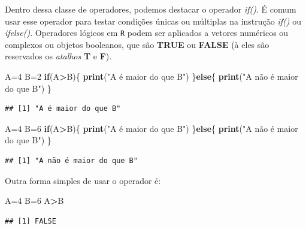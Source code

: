 \documentclass[
]{book}
\newenvironment{Shaded}{\begin{snugshade}}{\end{snugshade}}
\newcommand{\ControlFlowTok}[1]{\textcolor[rgb]{0.13,0.29,0.53}{\textbf{#1}}}
\newcommand{\DecValTok}[1]{\textcolor[rgb]{0.00,0.00,0.81}{#1}}
\newcommand{\KeywordTok}[1]{\textcolor[rgb]{0.13,0.29,0.53}{\textbf{#1}}}
\newcommand{\NormalTok}[1]{#1}
\newcommand{\OperatorTok}[1]{\textcolor[rgb]{0.81,0.36,0.00}{\textbf{#1}}}
\newcommand{\StringTok}[1]{\textcolor[rgb]{0.31,0.60,0.02}{#1}}
\theoremstyle{definition}
\theoremstyle{definition}
\theoremstyle{definition}
\theoremstyle{remark}
\begin{document}
Dentro dessa classe de operadores, podemos destacar o operador \emph{if()}. É comum usar esse operador para testar condições únicas ou múltiplas na instrução \emph{if()} ou \emph{ifelse()}. Operadores lógicos em \texttt{R} podem ser aplicados a vetores numéricos ou complexos ou objetos booleanos, que são \textbf{TRUE} ou \textbf{FALSE} (à eles são reservados os \emph{atalhos} \textbf{T} e \textbf{F}).

\begin{Shaded}
\begin{Highlighting}[]
\NormalTok{A=}\DecValTok{4}
\NormalTok{B=}\DecValTok{2}
\ControlFlowTok{if}\NormalTok{(A}\OperatorTok{>}\NormalTok{B)\{}
  \KeywordTok{print}\NormalTok{(}\StringTok{"A é maior do que B"}\NormalTok{)}
\NormalTok{  \}}\ControlFlowTok{else}\NormalTok{\{}
    \KeywordTok{print}\NormalTok{(}\StringTok{"A não é maior do que B"}\NormalTok{)}
\NormalTok{  \}}
\end{Highlighting}
\end{Shaded}

\begin{verbatim}
## [1] "A é maior do que B"
\end{verbatim}

\begin{Shaded}
\begin{Highlighting}[]
\NormalTok{A=}\DecValTok{4}
\NormalTok{B=}\DecValTok{6}
\ControlFlowTok{if}\NormalTok{(A}\OperatorTok{>}\NormalTok{B)\{}
  \KeywordTok{print}\NormalTok{(}\StringTok{"A é maior do que B"}\NormalTok{)}
\NormalTok{  \}}\ControlFlowTok{else}\NormalTok{\{}
    \KeywordTok{print}\NormalTok{(}\StringTok{"A não é maior do que B"}\NormalTok{)}
\NormalTok{  \}}
\end{Highlighting}
\end{Shaded}

\begin{verbatim}
## [1] "A não é maior do que B"
\end{verbatim}

Outra forma simples de usar o operador é:

\begin{Shaded}
\begin{Highlighting}[]
\NormalTok{A=}\DecValTok{4}
\NormalTok{B=}\DecValTok{6}
\NormalTok{A}\OperatorTok{>}\NormalTok{B}
\end{Highlighting}
\end{Shaded}

\begin{verbatim}
## [1] FALSE
\end{verbatim}
\end{document}
